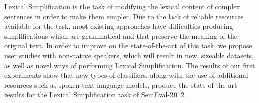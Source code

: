 Lexical Simplification is the task of modifying the lexical content of complex sentences in order to make them simpler. Due to the lack of reliable resources available for the task, most existing approaches have difficulties producing simplifications which are grammatical and that preserve the meaning of the original text. In order to improve on the state-of-the-art of this task, we propose user studies with non-native speakers, which will result in new, sizeable datasets, as well as novel ways of performing Lexical Simplification. The results of our first experiments show that new types of classifiers, along with the use of additional resources such as spoken text language models, produce the state-of-the-art results for the Lexical Simplification task of SemEval-2012.

